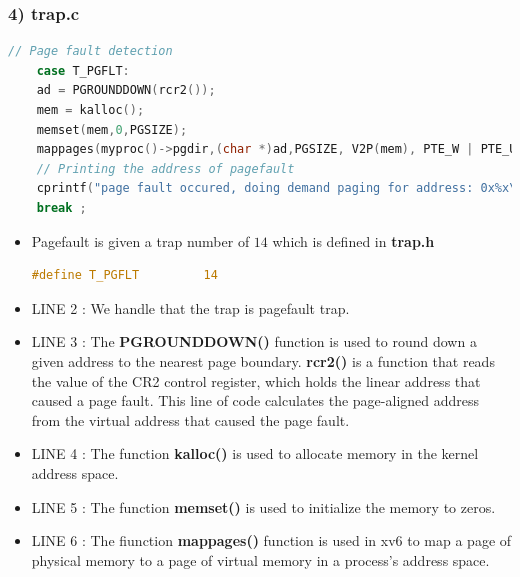 \documentclass[12pt,a4paper]{article}
\begin{document}
	\subsubsection*{4) trap.c}
									\begin{lstlisting}[language=C, style = mystyle]
	// Page fault detection 
	case T_PGFLT:
	ad = PGROUNDDOWN(rcr2());
	mem = kalloc();
	memset(mem,0,PGSIZE);
	mappages(myproc()->pgdir,(char *)ad,PGSIZE, V2P(mem), PTE_W | PTE_U);
	// Printing the address of pagefault
	cprintf("page fault occured, doing demand paging for address: 0x%x\n",rcr2());
	break ;
\end{lstlisting}
\begin{itemize}
	\item Pagefault is given a trap number of $14$ which is defined in \textbf{trap.h}
										\begin{lstlisting}[language=C, style = mystyle]
		#define T_PGFLT         14 
	\end{lstlisting}
\item LINE 2 : We handle that the trap is pagefault trap.
\item LINE 3 : The \textbf{PGROUNDDOWN()} function is used to round down a given address to the nearest page boundary. \textbf{rcr2()} is a function that reads the value of the CR2 control register, which holds the linear address that caused a page fault. This line of code calculates the page-aligned address from the virtual address that caused the page fault.
\item LINE 4 : The function \textbf{kalloc()} is used to allocate memory in the kernel address space.
\item LINE 5 : The function \textbf{memset()} is used to initialize the memory to zeros.
\item LINE 6 : The fiunction \textbf{mappages()} function is used in xv6 to map a page of physical memory to a page of virtual memory in a process's address space.

\end{itemize}
\end{document}
